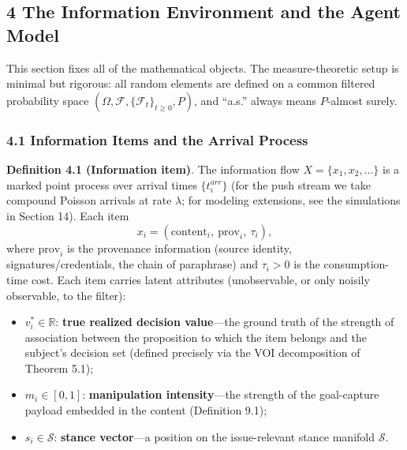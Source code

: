\documentclass[
  11pt]{article}
\providecommand{\tightlist}{%
  \setlength{\itemsep}{0pt}\setlength{\parskip}{0pt}}
\begin{document}
\subsection{4 The Information Environment and the Agent
Model}\label{the-information-environment-and-the-agent-model}

This section fixes all of the mathematical objects. The
measure-theoretic setup is minimal but rigorous: all random elements are
defined on a common filtered probability space
\((\Omega, \mathcal{F}, \{\mathcal{F}_t\}_{t\ge0}, P)\), and ``a.s.''
always means \(P\)-almost surely.

\subsubsection{4.1 Information Items and the Arrival
Process}\label{information-items-and-the-arrival-process}

\textbf{Definition 4.1 (Information item)}. The information flow
\(X = \{x_1, x_2, \dots\}\) is a marked point process over arrival times
\(\{t_i^{arr}\}\) (for the push stream we take compound Poisson arrivals
at rate \(\lambda\); for modeling extensions, see the simulations in
Section 14). Each item
\[x_i = (\mathrm{content}_i,\ \mathrm{prov}_i,\ \tau_i),\] where
\(\mathrm{prov}_i\) is the provenance information (source identity,
signatures/credentials, the chain of paraphrase) and \(\tau_i > 0\) is
the consumption-time cost. Each item carries latent attributes
(unobservable, or only noisily observable, to the filter):

\begin{itemize}
\tightlist
\item
  \(v_i^* \in \mathbb{R}\): \textbf{true realized decision value}---the
  ground truth of the strength of association between the proposition to
  which the item belongs and the subject's decision set (defined
  precisely via the VOI decomposition of Theorem 5.1);
\item
  \(m_i \in [0,1]\): \textbf{manipulation intensity}---the strength of
  the goal-capture payload embedded in the content (Definition 9.1);
\item
  \(s_i \in \mathcal{S}\): \textbf{stance vector}---a position on the
  issue-relevant stance manifold \(\mathcal{S}\).
\end{itemize}
\end{document}
